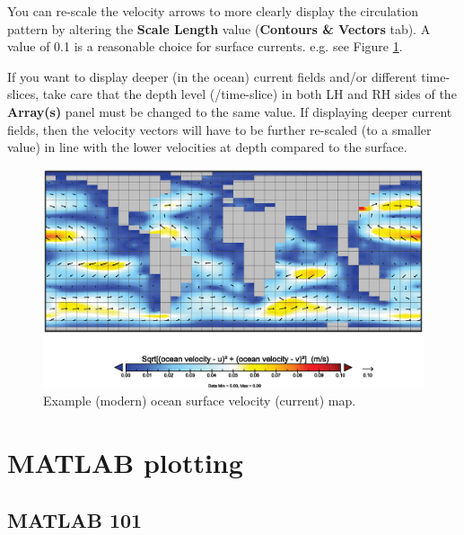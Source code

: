 \documentclass[11pt,fleqn]{book} %
\begin{document}
You can re-scale the velocity arrows to more clearly display the circulation pattern by altering the \textbf{Scale Length} value (\textbf{Contours \& Vectors} tab). A value of 0.1 is a reasonable choice for surface currents. e.g. see Figure \ref{fig:cgenie_currents}.

If you want to display deeper (in the ocean) current fields and/or different time-slices, take care that the depth level (/time-slice) in both LH and RH sides of the \textbf{Array(s)} panel must be changed to the same value. If displaying deeper current fields, then the velocity vectors will have to be further re-scaled (to a smaller value) in line with the lower velocities at depth compared to the surface.

\begin{figure}[ht]
\begin{center}
\includegraphics[scale=0.5]{cgenie_currents.eps}
\end{center}
\caption{Example (modern) ocean surface velocity (current) map.}
\label{fig:cgenie_currents}
\end{figure}


\newpage


\section{MATLAB plotting}


\subsection{MATLAB 101}
\end{document}

